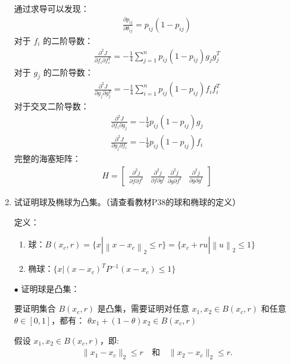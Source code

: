 \documentclass[UTF8]{ctexart}
\begin{document}
\begin{enumerate}
		通过求导可以发现：
		\begin{align*}
			\frac {\partial p_{ij}}{\partial \theta_{ij}}=p_{ij}(1-p_{ij})
		\end{align*}
		对于 $f_i$ 的二阶导数：
		\begin{align*}
				\frac {\partial^2 J}{\partial f_i\partial f_i^T} = -\frac {1}{4}\sum_{j=1}^n p_{ij}(1-p_{ij}) g_jg_j^T
		\end{align*}
		对于 $g_j$ 的二阶导数：
		\begin{align*}
			\frac {\partial^2 J}{\partial g_j\partial g_j^T} = -\frac {1}{4}\sum_{i=1}^n p_{ij}(1-p_{ij}) f_if_i^T
		\end{align*}
		对于交叉二阶导数：
		\begin{align*}
			\frac {\partial^2 J}{\partial f_i\partial g_j} = -\frac {1}{4} p_{ij}(1-p_{ij}) g_j \\
			\frac {\partial^2 J}{\partial g_j\partial f_i} = -\frac {1}{4} p_{ij}(1-p_{ij}) f_i
		\end{align*}
		完整的海塞矩阵：
		\begin{align*}
			H = \begin {bmatrix}
			\frac {\partial^2 j}{\partial f\partial f^t} & \frac {\partial^2 j}{\partial f\partial g^t} \
			\frac {\partial^2 j}{\partial g\partial f^t} & \frac {\partial^2 j}{\partial g\partial g^t}
			\end {bmatrix}
		\end{align*}





		\item 试证明球及椭球为凸集。（请查看教材P38的球和椭球的定义）

		定义：
		\begin{enumerate}
			\item 球：$B (x_c,r)=\{x|\left\|x-x_c\right\|_2\leq r\}=\{x_c+ru|\left\|u\right\|_2\leq1\}$

			\item 椭球：$\{x|(x-x_c)^TP^{-1}(x-x_c)\leq1\}$
		\end{enumerate}

		$\bullet$ 证明球是凸集：

		要证明集合 $B(x_c,r)$ 是凸集，需要证明对任意 $x_1,x_2 \in B(x_c,r)$ 和任意 $\theta \in [0,1]$，都有：
		$\theta x_1 + (1-\theta)x_2 \in B(x_c,r)$

		假设 \(x_1, x_2 \in B(x_c, r)\)，即:
		\begin{align*}
			\|x_1 - x_c\|_2 \leq r \quad \text{和} \quad \|x_2 - x_c\|_2 \leq r.
		\end{align*}


\end{enumerate}
\end{document}
